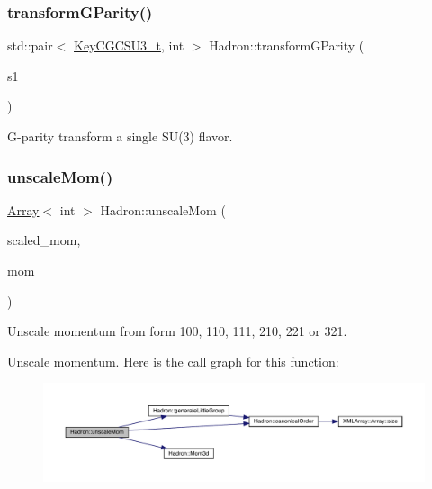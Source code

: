 \subsubsection{\texorpdfstring{transformGParity()}{transformGParity()}}
{\footnotesize\ttfamily std\+::pair$<$ \mbox{\hyperlink{structHadron_1_1KeyCGCSU3__t}{Key\+C\+G\+C\+S\+U3\+\_\+t}}, int $>$ Hadron\+::transform\+G\+Parity (\begin{DoxyParamCaption}\item[{const \mbox{\hyperlink{structHadron_1_1KeyCGCSU3__t}{Key\+C\+G\+C\+S\+U3\+\_\+t}} \&}]{s1 }\end{DoxyParamCaption})}



G-\/parity transform a single S\+U(3) flavor. 

\mbox{\label{namespaceHadron_ad5e2b22f66d2effe70db7f0ba129eae1}} 
\subsubsection{\texorpdfstring{unscaleMom()}{unscaleMom()}}
{\footnotesize\ttfamily \mbox{\hyperlink{classXMLArray_1_1Array}{Array}}$<$ int $>$ Hadron\+::unscale\+Mom (\begin{DoxyParamCaption}\item[{const \mbox{\hyperlink{classXMLArray_1_1Array}{Array}}$<$ int $>$ \&}]{scaled\+\_\+mom,  }\item[{const \mbox{\hyperlink{classXMLArray_1_1Array}{Array}}$<$ int $>$ \&}]{mom }\end{DoxyParamCaption})}



Unscale momentum from form 100, 110, 111, 210, 221 or 321. 

Unscale momentum. Here is the call graph for this function\+:\nopagebreak
\begin{figure}[H]
\begin{center}
\leavevmode
\includegraphics[width=350pt]{d1/daf/namespaceHadron_ad5e2b22f66d2effe70db7f0ba129eae1_cgraph}
\end{center}
\end{figure}
\mbox{\label{namespaceHadron_a63c49af65c1d943a78205d3b8b63079a}} 
